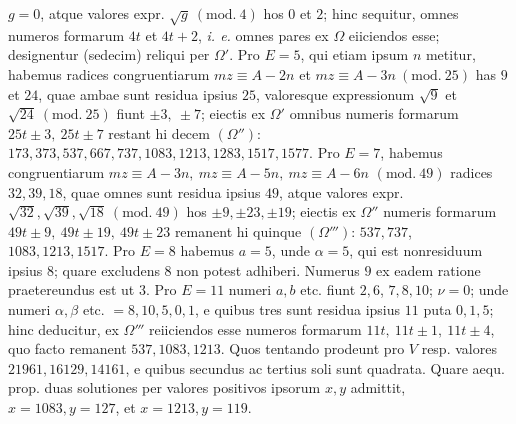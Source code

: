 \(g=0\), atque valores expr. \(\surd{g}\ (\mathrm{mod.}\ 4)\) hos \(0\) et \(2\); hinc sequitur, omnes numeros formarum \(4t\) et \(4t+2\), \textit{i. e.} omnes pares ex \(\Omega\) eiiciendos esse; designentur (sedecim) reliqui per \(\Omega'\). Pro \(E=5\), qui etiam ipsum \(n\) metitur, habemus radices congruentiarum \(mz\equiv A-2n\) et \(mz\equiv A-3n\ (\mathrm{mod.}\ 25)\) has \(9\) et \(24\), quae ambae sunt residua ipsius \(25\), valoresque expressionum \(\surd9\) et \(\surd{24}\ (\mathrm{mod.}\ 25)\) fiunt \(\pm3,\allowbreak \ \pm7\); eiectis ex \(\Omega'\) omnibus numeris formarum \(25t\pm3,\allowbreak \ 25t\pm7\) restant hi decem \((\Omega'')\): \(173,\allowbreak 373,\allowbreak 537,\allowbreak 667,\allowbreak 737,\allowbreak 1083,\allowbreak 1213,\allowbreak 1283,\allowbreak 1517,\allowbreak 1577\). Pro \(E=7\), habemus congruentiarum \(mz\equiv A-3n,\allowbreak \ mz\equiv A-5n,\allowbreak \ mz\equiv A-6n\) \((\mathrm{mod.}\ 49)\) radices \(32,\allowbreak 39,\allowbreak 18\), quae omnes sunt residua ipsius \(49\), atque valores expr. \(\surd{32},\allowbreak \surd{39},\allowbreak \surd{18}\ (\mathrm{mod.}\ 49)\) hos \(\pm9,\allowbreak \pm23,\allowbreak \pm19\); eiectis ex \(\Omega''\) numeris formarum \(49t\pm9,\allowbreak \ 49t\pm19,\allowbreak \ 49t\pm23\) remanent hi quinque \((\Omega''')\): \(537,\allowbreak 737\), \(1083,\allowbreak 1213,\allowbreak 1517\). Pro \(E=8\) habemus \(a=5\), unde \(\alpha=5\), qui est nonresiduum ipsius \(8\); quare excludens \(8\) non potest adhiberi. Numerus \(9\) ex eadem ratione praetereundus est ut \(3\). Pro \(E=11\) numeri \(a,\allowbreak b\) etc. fiunt \(2,\allowbreak 6\), \(7,\allowbreak 8,\allowbreak 10\); \(\nu=0\); unde numeri \(\alpha,\allowbreak \beta\) etc. \(=8,\allowbreak 10,\allowbreak 5,\allowbreak 0,\allowbreak 1\), e quibus tres sunt residua ipsius \(11\) puta \(0,\allowbreak 1,\allowbreak 5\); hinc deducitur, ex \(\Omega'''\) reiiciendos esse numeros formarum \(11t,\allowbreak \ 11t\pm1,\allowbreak \ 11t\pm4\), quo facto remanent \(537,\allowbreak 1083,\allowbreak 1213\). Quos tentando prodeunt pro \(V\) resp. valores \(21961,\allowbreak 16129,\allowbreak 14161\), e quibus secundus ac tertius soli sunt quadrata. Quare aequ. prop. duas solutiones per valores positivos ipsorum \(x,\allowbreak y\) admittit, \(x=1083,\allowbreak y=127\), et \(x=1213,\allowbreak y=119\).

